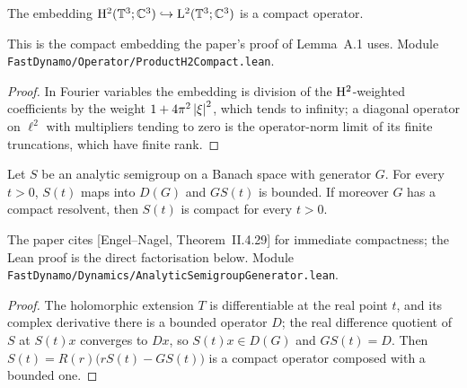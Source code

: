 \begin{lemma}
  \label{lem:dynamics:compact-embedding}
  \leanok
  The embedding $\mathrm{H}^2(\mathbb{T}^3;\mathbb{C}^3)\hookrightarrow\mathrm{L}^2(\mathbb{T}^3;\mathbb{C}^3)$ is a compact operator.
\end{lemma}

This is the compact embedding the paper's proof of Lemma~A.1 uses.  Module
\texttt{FastDynamo/Operator/ProductH2Compact.lean}.

\begin{proof}
  \leanok
  In Fourier variables the embedding is division of the $\mathrm{H}^2$-weighted coefficients by the
  weight $1+4\pi^2\left\lvert\xi\right\rvert^2$, which tends to infinity; a diagonal operator on $\ell^2$ with
  multipliers tending to zero is the operator-norm limit of its finite truncations, which have
  finite rank.
\end{proof}

\begin{lemma}
  \label{lem:dynamics:immediate-compactness}
  \leanok
  Let $S$ be an analytic semigroup on a Banach space with generator $G$.  For every $t>0$,
  $S(t)$ maps into $D(G)$ and $GS(t)$ is bounded.  If moreover $G$ has a compact resolvent,
  then $S(t)$ is compact for every $t>0$.
\end{lemma}

The paper cites [Engel--Nagel, Theorem~II.4.29] for immediate compactness; the Lean proof is
the direct factorisation below.  Module
\texttt{FastDynamo/Dynamics/AnalyticSemigroupGenerator.lean}.

\begin{proof}
  \leanok
  The holomorphic extension $T$ is differentiable at the real point $t$, and its complex
  derivative there is a bounded operator $D$; the real difference quotient of $S$ at $S(t)x$
  converges to $Dx$, so $S(t)x\in D(G)$ and $GS(t)=D$.  Then
  $S(t)=R(r)\bigl(rS(t)-GS(t)\bigr)$ is a compact operator composed with a bounded one.
\end{proof}

